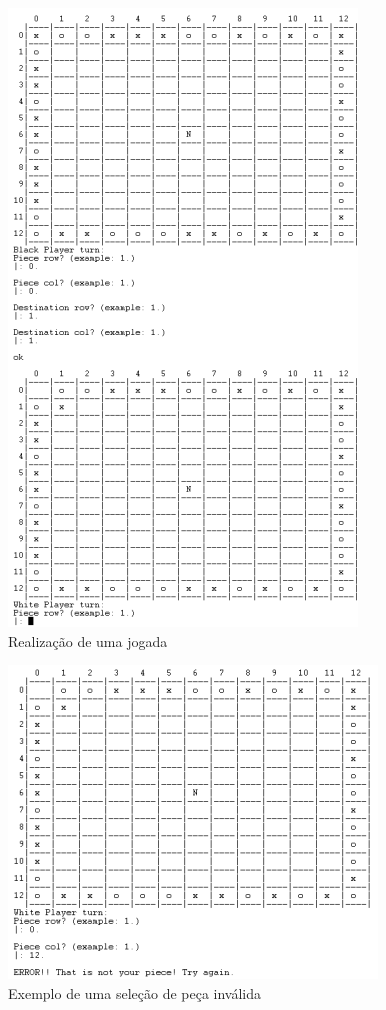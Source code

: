 \documentclass[a4paper]{article}
\begin{document}
\begin{figure}[h!]
\begin{center}
\hspace*{-0.5cm}\includegraphics[scale=1]{game1.png}
\caption{Realização de uma jogada}
\end{center}
\end{figure}

\begin{figure}[h!]
\begin{center}
\hspace*{-0.5cm}\includegraphics[scale=1]{game2.png}
\caption{Exemplo de uma seleção de peça inválida}
\end{center}
\end{figure}
\end{document}
